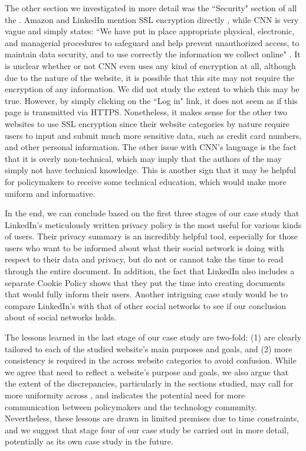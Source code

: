 \documentclass{acm_proc_article-sp}
\begin{document}
The other section we investigated in more detail was the ``Security" section of all the \pps. Amazon and LinkedIn mention SSL encryption directly \cite{amazon,linkedin}, while CNN is very vague and simply states: ``We have put in place appropriate physical, electronic, and managerial procedures to safeguard and help prevent unauthorized access, to maintain data security, and to use correctly the information we collect online" \cite{cnn}. It is unclear whether or not CNN even uses any kind of encryption at all, although due to the nature of the website, it is possible that this site may not require the encryption of any information. We did not study the extent to which this may be true. However, by simply clicking on the ``Log in" link, it does not seem as if this page is transmitted via HTTPS. Nonetheless, it makes sense for the other two websites to use SSL encryption since their website categories by nature require users to input and submit much more sensitive data, such as credit card numbers, and other personal information. The other issue with CNN's language is the fact that it is overly non-technical, which may imply that the authors of the \pp may simply not have technical knowledge. This is another sign that it may be helpful for policymakers to receive some technical education, which would make \pps more uniform and informative.

In the end, we can conclude based on the first three stages of our case study that LinkedIn's meticulously written privacy policy is the most useful for various kinds of users. Their privacy summary is an incredibly helpful tool, especially for those users who want to be informed about what their social network is doing with respect to their data and privacy, but do not or cannot take the time to read through the entire document. In addition, the fact that LinkedIn also includes a separate Cookie Policy shows that they put the time into creating documents that would fully inform their users. Another intriguing case study would be to compare LinkedIn's \pp with that of other social networks to see if our conclusion about \pps of social networks holds. 

The lessons learned in the last stage of our case study are two-fold: (1) \pps are clearly tailored to each of the studied website's main purposes and goals, and (2) more consistency is required in the \pps across website categories to avoid confusion. While we agree that \pps need to reflect a website's purpose and goals, we also argue that the extent of the discrepancies, particularly in the sections studied, may call for more uniformity across \pps, and indicates the potential need for more communication between policymakers and the technology community. Nevertheless, these lessons are drawn in limited premises due to time constraints, and we suggest that stage four of our case study be carried out in more detail, potentially as its own case study in the future.
\end{document}
